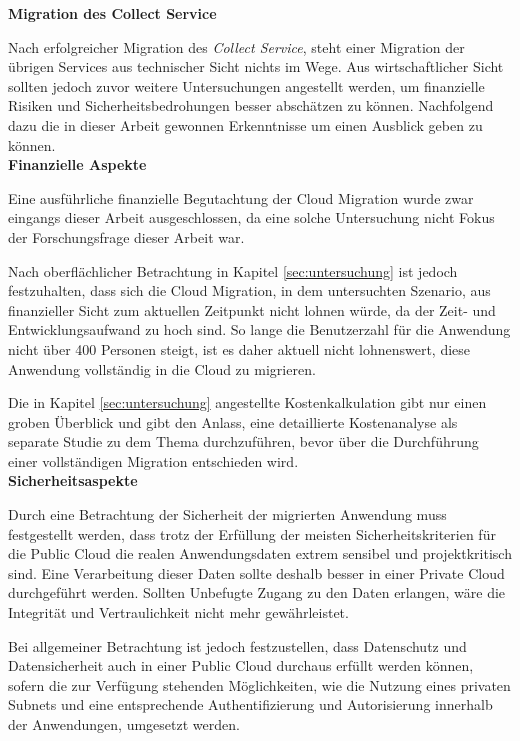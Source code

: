\textbf{Migration des Collect Service}

Nach erfolgreicher Migration des \textit{Collect Service}, steht einer Migration der übrigen Services aus technischer Sicht nichts im Wege. Aus wirtschaftlicher Sicht sollten jedoch zuvor weitere Untersuchungen angestellt werden, um finanzielle Risiken und Sicherheitsbedrohungen besser abschätzen zu können. Nachfolgend dazu die in dieser Arbeit gewonnen Erkenntnisse um einen Ausblick geben zu können. \\

\textbf{Finanzielle Aspekte}

Eine ausführliche finanzielle Begutachtung der Cloud Migration wurde zwar eingangs dieser Arbeit ausgeschlossen, da eine solche Untersuchung nicht Fokus der Forschungsfrage dieser Arbeit war.

Nach oberflächlicher Betrachtung in Kapitel \ref{sec:untersuchung} ist jedoch festzuhalten, dass sich die Cloud Migration, in dem untersuchten Szenario, aus finanzieller Sicht zum aktuellen Zeitpunkt nicht lohnen würde, da der Zeit- und Entwicklungsaufwand zu hoch sind. So lange die Benutzerzahl für die Anwendung nicht über 400 Personen steigt, ist es daher aktuell nicht lohnenswert, diese Anwendung vollständig in die Cloud zu migrieren.

Die in Kapitel \ref{sec:untersuchung} angestellte Kostenkalkulation gibt nur einen groben Überblick und gibt den Anlass, eine detaillierte Kostenanalyse als separate Studie zu dem Thema durchzuführen, bevor über die Durchführung einer vollständigen Migration entschieden wird. \\

\textbf{Sicherheitsaspekte}

Durch eine Betrachtung der Sicherheit der migrierten Anwendung muss festgestellt werden, dass trotz der Erfüllung der meisten Sicherheitskriterien für die Public Cloud die realen Anwendungsdaten extrem sensibel und projektkritisch sind. Eine Verarbeitung dieser Daten sollte deshalb besser in einer Private Cloud durchgeführt werden. Sollten Unbefugte Zugang zu den Daten erlangen, wäre die Integrität und Vertraulichkeit nicht mehr gewährleistet.

Bei allgemeiner Betrachtung ist jedoch festzustellen, dass Datenschutz und Datensicherheit auch in einer Public Cloud durchaus erfüllt werden können, sofern die zur Verfügung stehenden Möglichkeiten, wie die Nutzung eines privaten Subnets und eine entsprechende Authentifizierung und Autorisierung innerhalb der Anwendungen, umgesetzt werden. \pagebreak

